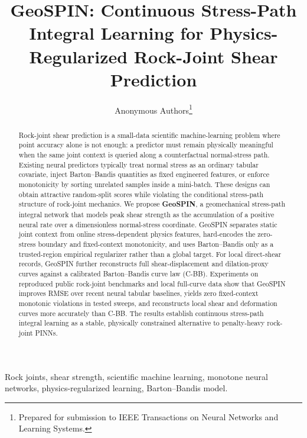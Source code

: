 \documentclass[journal]{IEEEtran}
\title{GeoSPIN: Continuous Stress-Path Integral Learning for Physics-Regularized Rock-Joint Shear Prediction}
\author{Anonymous Authors\thanks{Prepared for submission to IEEE Transactions on Neural Networks and Learning Systems.}}
\begin{document}
\maketitle

\begin{abstract}
Rock-joint shear prediction is a small-data scientific machine-learning problem where point accuracy alone is not enough: a predictor must remain physically meaningful when the same joint context is queried along a counterfactual normal-stress path. Existing neural predictors typically treat normal stress as an ordinary tabular covariate, inject Barton--Bandis quantities as fixed engineered features, or enforce monotonicity by sorting unrelated samples inside a mini-batch. These designs can obtain attractive random-split scores while violating the conditional stress-path structure of rock-joint mechanics. We propose \textbf{GeoSPIN}, a geomechanical stress-path integral network that models peak shear strength as the accumulation of a positive neural rate over a dimensionless normal-stress coordinate. GeoSPIN separates static joint context from online stress-dependent physics features, hard-encodes the zero-stress boundary and fixed-context monotonicity, and uses Barton--Bandis only as a trusted-region empirical regularizer rather than a global target. For local direct-shear records, GeoSPIN further reconstructs full shear-displacement and dilation-proxy curves against a calibrated Barton--Bandis curve law (C-BB). Experiments on reproduced public rock-joint benchmarks and local full-curve data show that GeoSPIN improves RMSE over recent neural tabular baselines, yields zero fixed-context monotonic violations in tested sweeps, and reconstructs local shear and deformation curves more accurately than C-BB. The results establish continuous stress-path integral learning as a stable, physically constrained alternative to penalty-heavy rock-joint PINNs.
\end{abstract}

\begin{IEEEkeywords}
Rock joints, shear strength, scientific machine learning, monotone neural networks, physics-regularized learning, Barton--Bandis model.
\end{IEEEkeywords}
\end{document}
